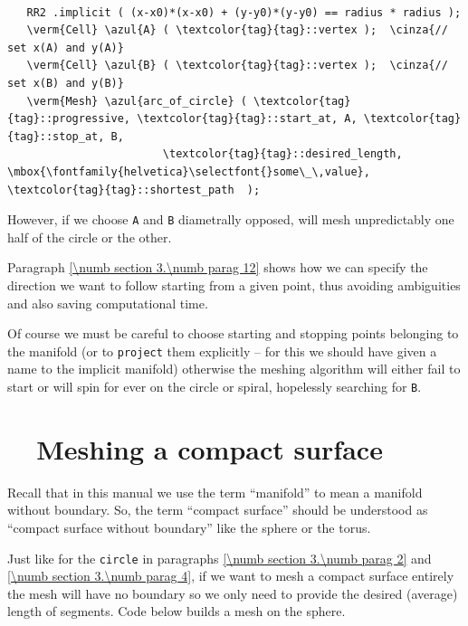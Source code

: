 \begin{Verbatim}[commandchars=\\\{\},formatcom=\small\tt,
   baselinestretch=0.94,framesep=2mm                      ]

   RR2 .implicit ( (x-x0)*(x-x0) + (y-y0)*(y-y0) == radius * radius );
   \verm{Cell} \azul{A} ( \textcolor{tag}{tag}::vertex );  \cinza{// set x(A) and y(A)}
   \verm{Cell} \azul{B} ( \textcolor{tag}{tag}::vertex );  \cinza{// set x(B) and y(B)}
   \verm{Mesh} \azul{arc_of_circle} ( \textcolor{tag}{tag}::progressive, \textcolor{tag}{tag}::start_at, A, \textcolor{tag}{tag}::stop_at, B,
                        \textcolor{tag}{tag}::desired_length, \mbox{\fontfamily{helvetica}\selectfont{}some\_\,value}, \textcolor{tag}{tag}::shortest_path  );
\end{Verbatim}

However, if we choose {\small\tt A} and {\small\tt B} diametrally opposed, {\maniFEM} will
mesh unpredictably one half of the circle or the other.

Paragraph \ref{\numb section 3.\numb parag 12} shows how we can specify the direction we
want to follow starting from a given point, thus avoiding ambiguities and also saving
computational time.

Of course we must be careful to choose starting and stopping points belonging to the manifold
(or to {\small\tt project} them explicitly -- for this we should have given a name to the
implicit manifold) otherwise the meshing algorithm will either fail to start or will spin
for ever on the circle or spiral, hopelessly searching for {\small\tt B}.


\section{~~Meshing a compact surface}\label{\numb section 3.\numb parag 6}

Recall that in this manual we use the term ``manifold'' to mean a manifold without boundary.
So, the term ``compact surface'' should be understood as ``compact surface without boundary''
like the sphere or the torus.

Just like for the {\small\tt circle} in paragraphs \ref{\numb section 3.\numb parag 2} and
\ref{\numb section 3.\numb parag 4}, if we want to mesh a compact surface entirely
the mesh will have no boundary so we only need to provide the desired (average) length
of segments.
Code below builds a mesh on the sphere.

